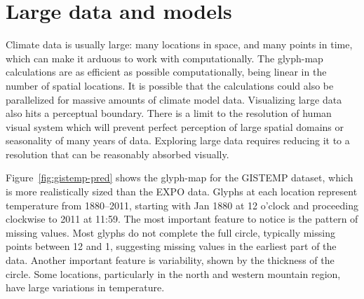 \documentclass[oneside]{article}
\begin{document}

\section{Large data and models}
\label{sec:large-data}

Climate data is usually large: many locations in space, and many points in time, which can make it arduous to work with computationally. The glyph-map calculations are as efficient as possible computationally, being linear in the number of spatial locations. It is possible that the calculations could also be parallelized for massive amounts of climate model data. Visualizing large data also hits a perceptual boundary.  There is a limit to the resolution of human visual system \citep{Kr12} which will prevent perfect perception of large spatial domains or seasonality of many years of data. Exploring large data requires reducing it to a resolution that can be reasonably absorbed visually.


Figure~\ref{fig:gistemp-pred} shows the glyph-map for the GISTEMP dataset, which is more realistically sized than the EXPO data. Glyphs at each location represent temperature from 1880--2011, starting with Jan 1880 at 12 o'clock and proceeding clockwise to 2011 at 11:59. The most important feature to notice is the pattern of missing values. Most glyphs do not complete the full circle, typically missing points between 12 and 1, suggesting missing values in the earliest part of the data. Another important feature is variability, shown by the thickness of the circle. Some locations, particularly in the north and western mountain region, have large variations in temperature. 
\end{document}
